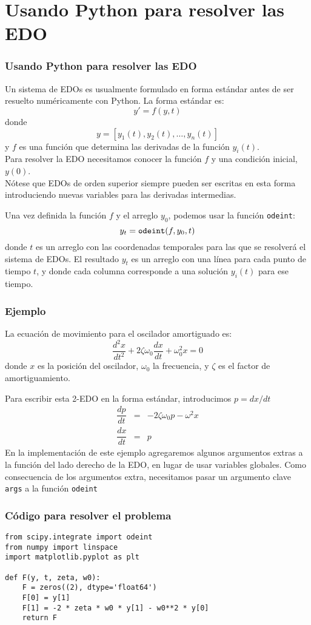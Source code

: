 \section{Usando Python para resolver las EDO}
\begin{frame}
\frametitle{Usando Python para resolver las EDO}
Un sistema de EDOs es usualmente formulado en forma estándar antes de ser resuelto numéricamente con Python. La forma estándar es:
\[ y' = f(y,t)\]
donde
\[ y=[y_{1}(t),y_{2}(t),\ldots,y_{n}(t)]\]
y $f$ es una función que determina las derivadas de la función $y_{i}(t)$.
\\
\medskip
Para resolver la EDO necesitamos conocer la función $f$ y una condición inicial, $y(0)$.
\\
\medskip
Nótese que EDOs de orden superior siempre pueden ser escritas en esta forma introduciendo nuevas variables para las derivadas intermedias.
\end{frame}
\begin{frame}
Una vez definida la función $f$ y el arreglo $y_{0}$, podemos usar la función \texttt{odeint}:
\[ y_{t} = \mbox{\texttt{odeint}}(f,y_{0},t)\]
donde $t$ es un arreglo con las coordenadas temporales para las que se resolverá el sistema de EDOs. El resultado $y_{t}$ es un arreglo con una línea para cada punto de tiempo $t$, y donde cada columna corresponde a una solución $y_{i}(t)$ para ese tiempo.
\end{frame}
\begin{frame}
\frametitle{Ejemplo}
La ecuación de movimiento para el oscilador amortiguado es:
\[ \dfrac{d^{2} x}{dt^{2}} + 2 \zeta \omega_{0} \dfrac{dx}{dt} + \omega_{0}^{2} x = 0\]
donde $x$ es la posición del oscilador, $\omega_{0}$ la frecuencia, y $\zeta$ es el factor de amortiguamiento.
\end{frame}
\begin{frame}
Para escribir esta 2-EDO en la forma estándar, introducimos $p= dx/dt$
\begin{eqnarray*}
\dfrac{dp}{dt} &=& - 2 \zeta \omega_{0} p - \omega^{2} x \\
\dfrac{dx}{dt} &=& p
\end{eqnarray*}
En la implementación de este ejemplo agregaremos algunos argumentos extras a la función del lado derecho de la EDO, en lugar de usar variables globales. Como consecuencia de los argumentos extra, necesitamos pasar un argumento clave \texttt{args} a la función \texttt{odeint}
\end{frame}
\begin{frame}[fragile]
\frametitle{Código para resolver el problema}
\begin{lstlisting}
from scipy.integrate import odeint
from numpy import linspace
import matplotlib.pyplot as plt

def F(y, t, zeta, w0):
    F = zeros((2), dtype='float64')
    F[0] = y[1]
    F[1] = -2 * zeta * w0 * y[1] - w0**2 * y[0]
    return F    

\end{lstlisting}
\end{frame}
